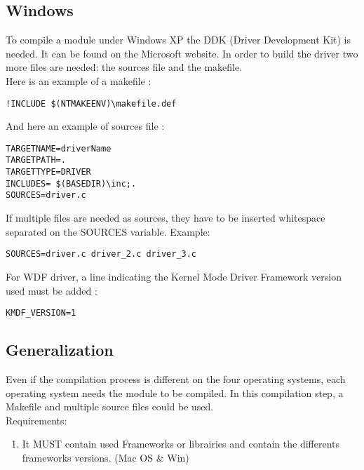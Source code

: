 \documentclass[11pt]{report}
\begin{document}
  \subsection{Windows}
To compile a module under Windows XP the DDK (Driver Development
Kit) is needed. It can be found on the Microsoft website.
In order to build the driver two more files are needed: the sources file and the makefile.\\
Here is an example of a makefile :
\begin{lstlisting}
!INCLUDE $(NTMAKEENV)\makefile.def
\end{lstlisting}
And here an example of sources file :
\begin{lstlisting}
TARGETNAME=driverName
TARGETPATH=.
TARGETTYPE=DRIVER
INCLUDES= $(BASEDIR)\inc;.
SOURCES=driver.c
\end{lstlisting}
If multiple files are needed as sources, they have to be inserted
whitespace separated on the SOURCES variable.
Example:
\begin{lstlisting}
SOURCES=driver.c driver_2.c driver_3.c
\end{lstlisting}
For WDF driver, a line indicating the Kernel Mode Driver Framework version used
must be added :
\begin{lstlisting}
KMDF_VERSION=1
\end{lstlisting}
  \subsection{Generalization}
  Even if the compilation process is different on the four operating systems,
  each operating system needs the module to be compiled.
  In this compilation step, a Makefile and multiple source
  files could be used.\\
  Requirements:
  \begin{enumerate}
	\item It MUST contain used Frameworks or librairies and contain the differents frameworks versions. (Mac OS \& Win)
  \end{enumerate}
  
\newpage
\end{document}
